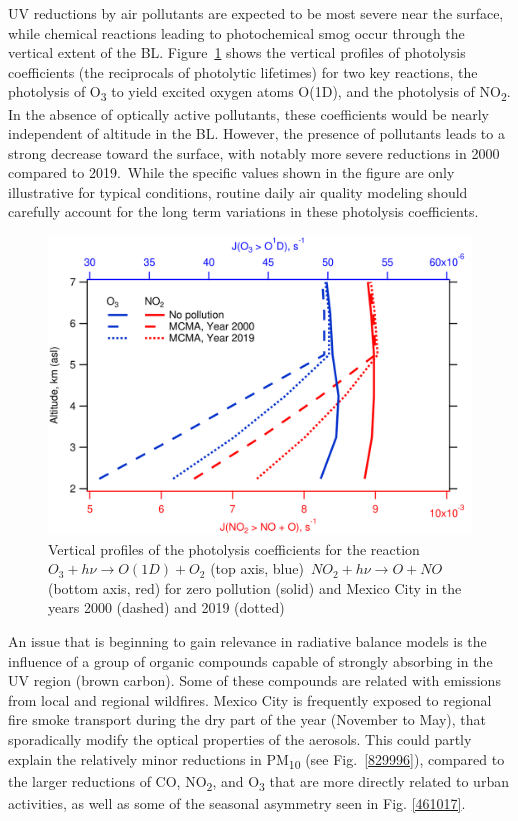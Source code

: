 \documentclass[10pt]{article}
\begin{document}
UV reductions by air pollutants are expected to be most severe near the
surface, while chemical reactions leading to photochemical smog occur
through the vertical extent of the BL.
Figure~{\ref{973680}} shows the vertical profiles of
photolysis coefficients (the reciprocals of photolytic lifetimes) for
two key reactions, the photolysis of O\textsubscript{3} to yield excited
oxygen atoms O(1D), and the photolysis of NO\textsubscript{2}. In the
absence of optically active pollutants, these coefficients would be
nearly independent of altitude in the BL. However, the presence of
pollutants leads to a strong decrease toward the surface, with notably
more severe reductions in 2000 compared to 2019.~While the specific
values shown in the figure are only illustrative for typical conditions,
routine daily air quality modeling should carefully account for the long
term variations in these photolysis coefficients.
\begin{figure}[H]
  \begin{center}
    \includegraphics[width=0.70\columnwidth]{figures/jvals}
    \caption{{Vertical profiles of the photolysis coefficients for the
          reaction~\(O_3 + h\nu \rightarrow O(1D) + O_2\) (top axis, blue)~\(NO_2 + h\nu \rightarrow O+NO \) (bottom
          axis, red) for zero pollution (solid) and Mexico City in the years 2000
          (dashed) and 2019 (dotted)
          {\label{973680}}%
        }}
  \end{center}
\end{figure}

An issue that is beginning to gain relevance in radiative balance models
is the influence of a group of organic compounds capable of strongly
absorbing in the UV region (brown carbon).\cite{Laskin_2015} Some of
these compounds are related with emissions from local and regional
wildfires.\cite{Gadhavi_2010} Mexico City is frequently exposed to
regional fire smoke transport during the dry part of the year (November
to May)\cite{Rios_2019}, that sporadically modify the optical
properties of the aerosols.\cite{Barnard_2008} This could partly explain
the relatively minor reductions in PM\textsubscript{10} (see
Fig.~{\ref{829996}}), compared to the larger reductions
of CO, NO\textsubscript{2}, and O\textsubscript{3} that are more
directly related to urban activities, as well as some of the seasonal
asymmetry seen in Fig. {\ref{461017}}. ~
\end{document}
